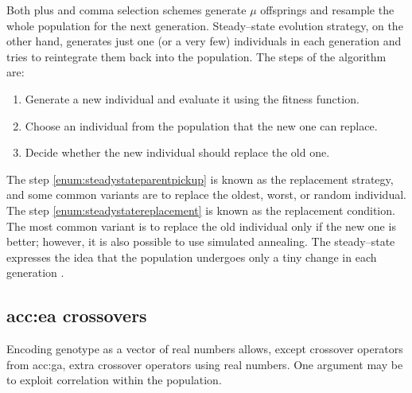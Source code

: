Both plus and comma selection schemes generate $\mu$ offsprings and resample the whole population for the next generation. Steady--state evolution strategy, on the other hand, generates just one (or a very few) individuals in each generation and tries to reintegrate them back into the population. The steps of the algorithm are:
\begin{enumerate}
    \item Generate a new individual and evaluate it using the fitness function.
    \item\label{enum:steadystateparentpickup} Choose an individual from the population that the new one can replace.
    \item\label{enum:steadystatereplacement} Decide whether the new individual should replace the old one.
\end{enumerate}
The step \ref{enum:steadystateparentpickup} is known as the replacement strategy, and some common variants are to replace the oldest, worst, or random individual. The step \ref{enum:steadystatereplacement} is known as the replacement condition. The most common variant is to replace the old individual only if the new one is better; however, it is also possible to use simulated annealing.
The steady--state expresses the idea that the population undergoes only a tiny change in each generation \citep{SteadyStateEvolutionStrategy}.

\subsection{\texorpdfstring{\acrshort*{acc:ea} crossovers}{Crossovers}}

Encoding genotype as a vector of real numbers allows, except crossover operators from \acrshort{acc:ga}, extra crossover operators using real numbers. One argument may be to exploit correlation within the population.

